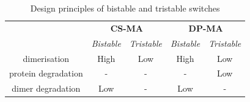 \begin{table}[]
\centering
\caption{Design principles of bistable and tristable switches}
\label{tab:des_prin}
\begin{tabular}{@{}ccccc@{}}
\toprule
                    & \multicolumn{2}{c}{\textbf{CS-MA}} & \multicolumn{2}{c}{\textbf{DP-MA}} \\ \cmidrule(l){2-3}\cmidrule(l){4-5}
                    & \textit{Bistable}    & \textit{Tristable}   & \textit{Bistable}    & \textit{Tristable}   \\\cmidrule(l){2-2}\cmidrule(l){3-3}\cmidrule(l){4-4}\cmidrule(l){5-5}
dimerisation        & High        & Low         & High        & Low         \\
protein degradation & -           & -           & -           & Low         \\
dimer degradation   & Low         & -           & Low         & -           \\\bottomrule
\end{tabular}
\end{table}

